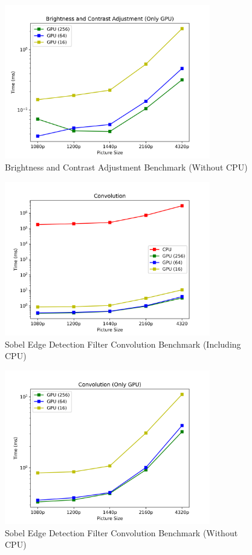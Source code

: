\documentclass[12pt]{article}
\begin{document}
\begin{figure}[H]
	\centering
	\includegraphics[width=0.8\textwidth]{./images/BCA2.png}	
	\cprotect\caption{Brightness and Contrast Adjustment Benchmark (Without CPU)}
	\label{fig:2}
\end{figure}



\begin{figure}[H]
	\centering
	\includegraphics[width=0.8\textwidth]{./images/Convolution.png}	
	\cprotect\caption{Sobel Edge Detection Filter Convolution Benchmark  (Including CPU)}
	\label{fig:3}
\end{figure}


\begin{figure}[H]
	\centering
	\includegraphics[width=0.8\textwidth]{./images/Convolution2.png}	
	\cprotect\caption{Sobel Edge Detection Filter Convolution Benchmark  (Without CPU)}
	\label{fig:4}
\end{figure}
\end{document}
